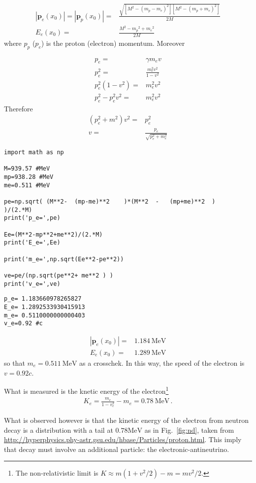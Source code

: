 \begin{align}
 |\mathbf{p}_e(x_0)|= |\mathbf{p}_p(x_0)|=&\frac{\sqrt{[M^2-({m_p}-{m_e})^2][M^2-({m_p}+{m_e})^2]}}{2M}\nonumber\\
E_e(x_0)=&  \frac{M^2-{m_p}^2+{m_e}^2}{2M}
\end{align}
where ${p}_p$ ($p_e$) is the proton (electron) momentum. Moreover

\begin{align*}
p_e=&\gamma m_e v\\
p_e^2 =&\frac{ m_e^2 v^2}{1-v^2}\\
p_e^2(1-v^2) =&m_e^2 v^2\\
p_e^2 -p_e^2v^2 =& m_e^2 v^2
\end{align*}
Therefore
\begin{align*}
  (p_e^2+ m^2 )v^2=&p_e^2\\
  v=&\frac{p_e}{\sqrt{p_e^2+ m_e^2 }}
\end{align*}


\begin{verbatim}
import math as np

M=939.57 #MeV
mp=938.28 #MeV
me=0.511 #MeV

pe=np.sqrt( (M**2-  (mp-me)**2    )*(M**2  -   (mp+me)**2  )    )/(2.*M)
print('p_e=',pe)

Ee=(M**2-mp**2+me**2)/(2.*M)
print('E_e=',Ee)

print('m_e=',np.sqrt(Ee**2-pe**2))

ve=pe/(np.sqrt(pe**2+ me**2 ) )
print('v_e=',ve)
\end{verbatim}

\begin{verbatim}
p_e= 1.183660978265827
E_e= 1.2892533930415913
m_e= 0.5110000000000403
v_e=0.92 #c
\end{verbatim}

\begin{align}
 |\mathbf{p}_e(x_0)|=& 1.184\ \text{MeV} \nonumber\\
E_e(x_0)=& 1.289\ \text{MeV}
\end{align}
so that $m_e=0.511\ \text{MeV}$ as a crosschek. In this way, the speed of the electron is $v=0.92c$. 

What is measured is the knetic energy of the electron\footnote{The non-relativistic limit is $K\approx m(1+v^2/2)-m=mv^2/2.$}
\begin{align}
  K_e=\frac{m_e}{1-v_e^2}-m_e=0.78\ \text{MeV}\,.
\end{align}

What is observed however is that the kinetic energy of the electron from neutron decay is a distribution with a tail at $0.78\text{MeV}$ as in Fig.~\ref{fig:nd}, taken from \url{http://hyperphysics.phy-astr.gsu.edu/hbase/Particles/proton.html}. This imply that decay must involve an additional particle: the electronic-antineutrino.

